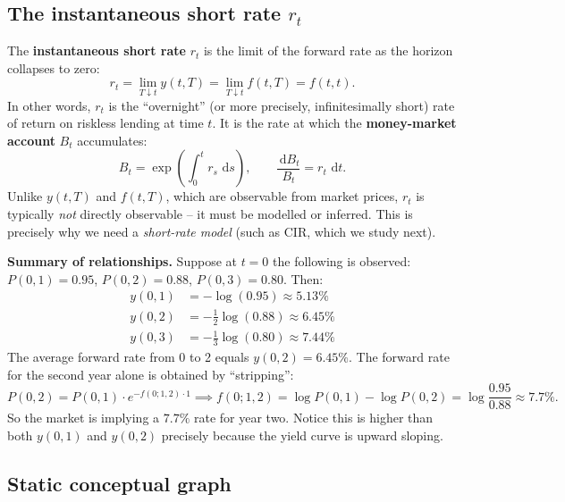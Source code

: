 \documentclass[11pt]{article}
\newcommand{\dd}{\,\mathrm{d}}
\begin{document}
\subsection{The instantaneous short rate $r_t$}

The \textbf{instantaneous short rate} $r_t$ is the limit of the forward
rate as the horizon collapses to zero:
\[
r_t = \lim_{T \downarrow t} y(t,T) = \lim_{T \downarrow t} f(t,T) = f(t,t).
\]
In other words, $r_t$ is the ``overnight'' (or more precisely,
infinitesimally short) rate of return on riskless lending at time $t$.  It
is the rate at which the \textbf{money-market account} $B_t$ accumulates:
\[
B_t = \exp\!\left(\int_0^t r_s\,\dd s\right), \qquad
\frac{\dd B_t}{B_t} = r_t\,\dd t.
\]
Unlike $y(t,T)$ and $f(t,T)$, which are observable from market prices, $r_t$
is typically \emph{not} directly observable -- it must be modelled or
inferred.  This is precisely why we need a \emph{short-rate model} (such as
CIR, which we study next).

\begin{example_box}
\textbf{Summary of relationships.}  Suppose at $t=0$ the following is
observed: $P(0,1)=0.95$, $P(0,2)=0.88$, $P(0,3)=0.80$.  Then:
\begin{align*}
y(0,1) &= -\log(0.95) \approx 5.13\% \\
y(0,2) &= -\tfrac{1}{2}\log(0.88) \approx 6.45\% \\
y(0,3) &= -\tfrac{1}{3}\log(0.80) \approx 7.44\%
\end{align*}
The average forward rate from 0 to 2 equals $y(0,2)=6.45\%$.  The forward
rate for the second year alone is obtained by ``stripping'':
\[
P(0,2) = P(0,1)\cdot e^{-f(0;1,2)\cdot 1}
\implies f(0;1,2) = \log P(0,1) - \log P(0,2) = \log\frac{0.95}{0.88} \approx 7.7\%.
\]
So the market is implying a $7.7\%$ rate for year two.  Notice this is
higher than both $y(0,1)$ and $y(0,2)$ precisely because the yield curve
is upward sloping.
\end{example_box}

\subsection{Static conceptual graph}
\end{document}
